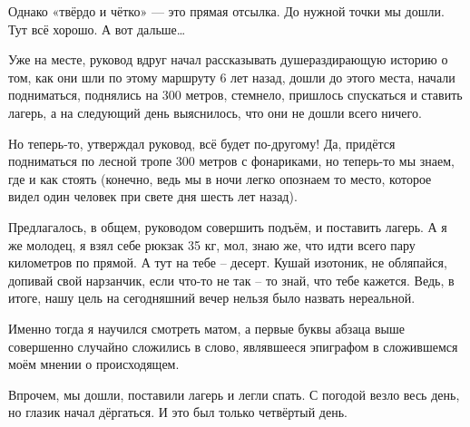 Однако «твёрдо и чётко» — это прямая отсылка. До нужной точки мы дошли. Тут всё хорошо. А вот дальше…

Уже на месте, руковод вдруг начал рассказывать душераздирающую историю о том, как они шли по этому маршруту 6 лет назад, дошли до этого места, начали подниматься, поднялись на 300 метров, стемнело, пришлось спускаться и ставить лагерь, а на следующий день выяснилось, что они не дошли всего ничего.

Но теперь-то, утверждал руковод, всё будет по-другому! Да, придётся подниматься по лесной тропе 300 метров с фонариками, но теперь-то мы знаем, где и как стоять (конечно, ведь мы в ночи легко опознаем то место, которое видел один человек при свете дня шесть лет назад).

Предлагалось, в общем, руководом совершить подъём, 
и поставить лагерь. А я же молодец, я взял себе рюкзак 35 кг, мол, знаю же, что идти всего пару километров по прямой. А тут на тебе – десерт. Кушай изотоник, не обляпайся, допивай свой нарзанчик, если что-то не так – то знай, что тебе кажется. Ведь, в итоге, нашу цель на сегодняшний вечер нельзя было назвать нереальной.

Именно тогда я научился смотреть матом, а первые буквы абзаца выше совершенно случайно сложились в слово, являвшееся эпиграфом в сложившемся моём мнении о происходящем.

Впрочем, мы дошли, поставили лагерь и легли спать. С погодой везло весь день, но глазик начал дёргаться. И это был только четвёртый день.

\clearpage